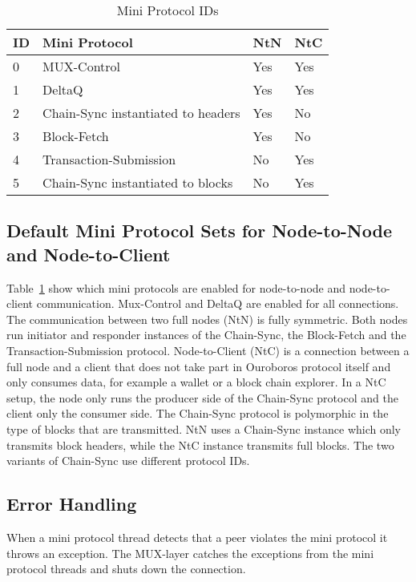 \documentclass{report}
\newcommand{\wip}[1]{}
\newcommand{\hide}[1]{}
\newcommand{\wip}[1]{\color{magenta}{#1}\color{black}}
\newcommand{\hide}[1]{}
\theoremstyle{definition}{
  \newtheorem{lemma}{Lemma}[section] %
  \newtheorem{definition}[lemma]{Definition}
}
\theoremstyle{theorem}{
  \newtheorem{invariant}[lemma]{Invariant}
  \newtheorem{proofobligation}[lemma]{Proof Obligation}
}
\numberwithin{equation}{lemma}
\begin{document}
\hide{Update needed !}
\begin{table}[ht]
\centering
\begin{tabular}{|l|l|l|l|}
  \hline
  ID & Mini Protocol                         & NtN  & NtC \\ \hline
  0  & MUX-Control                           & Yes  & Yes \\ \hline
  1  & DeltaQ                                & Yes  & Yes \\ \hline
  2  & Chain-Sync instantiated to headers    & Yes  & No \\ \hline
  3  & Block-Fetch                           & Yes  & No  \\ \hline
  4  & Transaction-Submission                & No   & Yes  \\ \hline
  5  & Chain-Sync instantiated to blocks     & No   & Yes  \\ \hline
\end{tabular}
\caption{Mini Protocol IDs}
\label{mini-protocol-id}
\end{table}

\subsection{Default Mini Protocol Sets for Node-to-Node and Node-to-Client}
Table~\ref{mini-protocol-id} show which mini protocols are enabled for node-to-node
and node-to-client communication.
Mux-Control and DeltaQ are enabled for all connections.
The communication between two full nodes (NtN) is fully symmetric.
Both nodes run initiator and responder instances of the
Chain-Sync, the Block-Fetch and the Transaction-Submission protocol.
Node-to-Client (NtC) is a connection between a full node and a client that does not take part in
Ouroboros protocol itself and only consumes data, for example a wallet or a block chain explorer.
In a NtC setup, the node only runs the producer side of the Chain-Sync protocol and the client only the
consumer side.
The Chain-Sync protocol is polymorphic in the type of blocks that are transmitted.
NtN uses a Chain-Sync instance which only transmits block headers, while the NtC instance transmits
full blocks.
The two variants of Chain-Sync use different protocol IDs.

%
\wip{
\subsection{Time Measurement}
}

\subsection{Error Handling}
When a mini protocol thread detects that a peer violates the mini protocol it throws an exception.
The MUX-layer catches the exceptions from the mini protocol threads and shuts down the connection.
\end{document}
